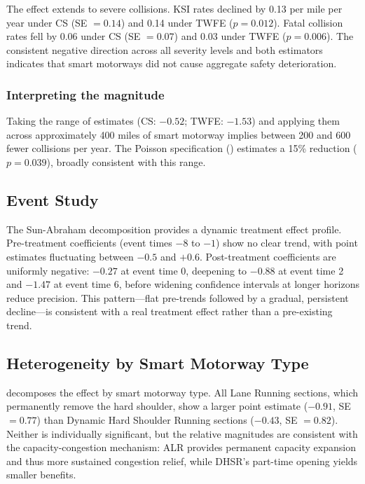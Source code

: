 \documentclass[12pt]{article}
\begin{document}
The effect extends to severe collisions. KSI rates declined by 0.13 per mile per year under CS (SE $= 0.14$) and 0.14 under TWFE ($p = 0.012$). Fatal collision rates fell by 0.06 under CS (SE $= 0.07$) and 0.03 under TWFE ($p = 0.006$). The consistent negative direction across all severity levels and both estimators indicates that smart motorways did not cause aggregate safety deterioration.

\subsubsection*{Interpreting the magnitude} Taking the range of estimates (CS: $-0.52$; TWFE: $-1.53$) and applying them across approximately 400 miles of smart motorway implies between 200 and 600 fewer collisions per year. The Poisson specification () estimates a 15\% reduction ($p = 0.039$), broadly consistent with this range.

\subsection{Event Study}

The Sun-Abraham decomposition provides a dynamic treatment effect profile. Pre-treatment coefficients (event times $-8$ to $-1$) show no clear trend, with point estimates fluctuating between $-0.5$ and $+0.6$. Post-treatment coefficients are uniformly negative: $-0.27$ at event time 0, deepening to $-0.88$ at event time 2 and $-1.47$ at event time 6, before widening confidence intervals at longer horizons reduce precision. This pattern---flat pre-trends followed by a gradual, persistent decline---is consistent with a real treatment effect rather than a pre-existing trend.

\subsection{Heterogeneity by Smart Motorway Type}



 decomposes the effect by smart motorway type. All Lane Running sections, which permanently remove the hard shoulder, show a larger point estimate ($-0.91$, SE $= 0.77$) than Dynamic Hard Shoulder Running sections ($-0.43$, SE $= 0.82$). Neither is individually significant, but the relative magnitudes are consistent with the capacity-congestion mechanism: ALR provides permanent capacity expansion and thus more sustained congestion relief, while DHSR's part-time opening yields smaller benefits.
\end{document}
